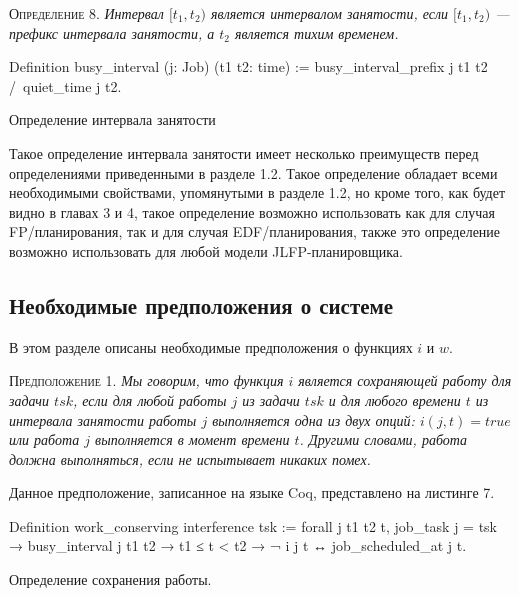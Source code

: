 \documentclass[14pt]{matmex-diploma-custom}
\begin{document}
\textsc{Определение 8.}
\textit{Интервал $[t_1,t_2)$ является интервалом занятости, 
  если $[t_1,t_2)$ --- префикс интервала занятости, а $t_2$ является тихим временем.
}


\begin{listing} 
\begin{pyglist}[numbers=none,numbersep=5pt, fontsize=\small]
  Definition busy_interval (j: Job) (t1 t2: time) :=
    busy_interval_prefix j t1 t2 /\  
    quiet_time j t2.
\end{pyglist}
\caption{Определение интервала занятости}
\label{lst:theorem2}   
\end{listing}

Такое определение интервала занятости имеет несколько преимуществ перед определениями 
  приведенными в разделе 1.2. Такое определение обладает всеми необходимыми свойствами, 
  упомянутыми в разделе 1.2, но кроме того, как будет видно в главах 3 и 4, такое 
  определение возможно использовать как для случая FP\-/планирования, 
  так и для случая EDF\-/планирования, также это определение возможно использовать 
  для любой модели JLFP-планировщика. 

\subsection{Необходимые предположения о системе}
 
В этом разделе описаны необходимые предположения о функциях $i$ и $w$. 
 
\textsc{Предположение 1.}
\textit{Мы говорим, что функция $i$ является сохраняющей работу для задачи $tsk$, 
  если для любой работы $j$ из задачи $tsk$ и для любого времени $t$ из интервала 
  занятости работы $j$ выполняется одна из двух опций: $i(j, t) = true$ или работа 
  $j$ выполняется в момент времени $t$. Другими словами, работа должна выполняться, 
  если не испытывает никаких помех. }

Данное предположение, записанное на языке Coq, представлено на листинге 7.  
  
\begin{listing} 
\begin{pyglist}[numbers=none,numbersep=5pt, fontsize=\small]
  Definition work_conserving interference tsk :=
    forall j t1 t2 t,
      job_task j = tsk →
      busy_interval j t1 t2 →
      t1 ≤ t < t2 →
      ¬ i j t ↔ job_scheduled_at j t.
\end{pyglist}
\caption{Определение сохранения работы.}
\label{lst:theorem2}   
\end{listing}
\end{document}

